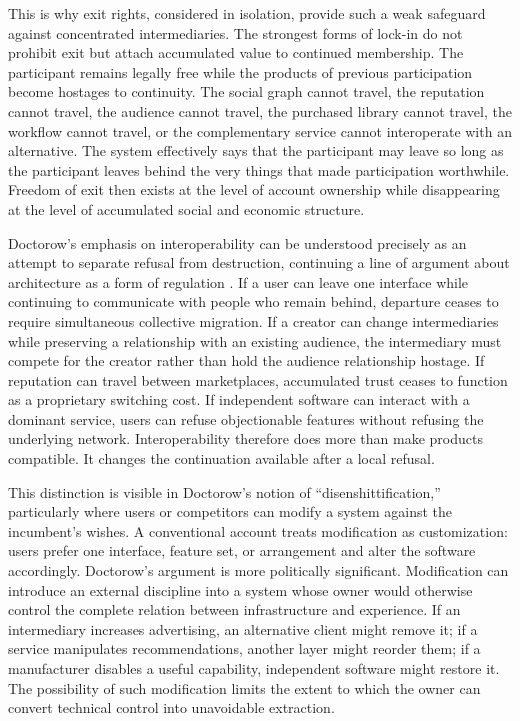\documentclass[11pt]{article}
\begin{document}
This is why exit rights, considered in isolation, provide such a weak safeguard against concentrated intermediaries. The strongest forms of lock-in do not prohibit exit but attach accumulated value to continued membership. The participant remains legally free while the products of previous participation become hostages to continuity. The social graph cannot travel, the reputation cannot travel, the audience cannot travel, the purchased library cannot travel, the workflow cannot travel, or the complementary service cannot interoperate with an alternative. The system effectively says that the participant may leave so long as the participant leaves behind the very things that made participation worthwhile. Freedom of exit then exists at the level of account ownership while disappearing at the level of accumulated social and economic structure.

Doctorow's emphasis on interoperability can be understood precisely as an attempt to separate refusal from destruction, continuing a line of argument about architecture as a form of regulation \citep{lessig2006code,wu2010master}. If a user can leave one interface while continuing to communicate with people who remain behind, departure ceases to require simultaneous collective migration. If a creator can change intermediaries while preserving a relationship with an existing audience, the intermediary must compete for the creator rather than hold the audience relationship hostage. If reputation can travel between marketplaces, accumulated trust ceases to function as a proprietary switching cost. If independent software can interact with a dominant service, users can refuse objectionable features without refusing the underlying network. Interoperability therefore does more than make products compatible. It changes the continuation available after a local refusal.

This distinction is visible in Doctorow's notion of ``disenshittification,'' particularly where users or competitors can modify a system against the incumbent's wishes. A conventional account treats modification as customization: users prefer one interface, feature set, or arrangement and alter the software accordingly. Doctorow's argument is more politically significant. Modification can introduce an external discipline into a system whose owner would otherwise control the complete relation between infrastructure and experience. If an intermediary increases advertising, an alternative client might remove it; if a service manipulates recommendations, another layer might reorder them; if a manufacturer disables a useful capability, independent software might restore it. The possibility of such modification limits the extent to which the owner can convert technical control into unavoidable extraction.
\end{document}
